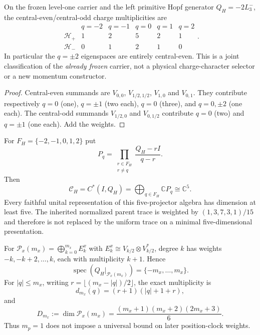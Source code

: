 \documentclass[12pt,a4paper]{article}
\begin{document}
\begin{corollary}
\label{p2d:cor:v260-joint-central-hopf-weights}
On the frozen level-one carrier and the left primitive Hopf generator
$Q_H=-2L_3^-$, the central-even/central-odd charge multiplicities are
\[
\begin{array}{c|ccccc}
 & q=-2&q=-1&q=0&q=1&q=2\\\hline
\mathcal H_+ &1&2&5&2&1\\
\mathcal H_- &0&1&2&1&0
\end{array}.
\]
In particular the $q=\pm2$ eigenspaces are entirely central-even.
This is a joint classification of the \emph{already frozen} carrier,
not a physical charge-character selector or a new momentum constructor.
\end{corollary}
\begin{proof}
Central-even summands are $V_{0,0}$, $V_{1/2,1/2}$,
$V_{1,0}$ and $V_{0,1}$. They contribute respectively
$q=0$ (one), $q=\pm1$ (two each), $q=0$ (three), and
$q=0,\pm2$ (one each). The central-odd summands
$V_{1/2,0}$ and $V_{0,1/2}$ contribute $q=0$ (two)
and $q=\pm1$ (one each). Add the weights.
\end{proof}


\begin{proposition}
\label{p2d:prop:generated-hopf-charge-algebra}
For $F_H=\{-2,-1,0,1,2\}$ put
\[
 P_q=\prod_{\substack{r\in F_H\\r\ne q}}
 \frac{Q_H-rI}{q-r}.
\]
Then
\[
 \mathcal C_H=C^*(I,Q_H)=\bigoplus_{q\in F_H}\mathbb CP_q\cong\mathbb C^5.
\]
Every faithful unital representation of this five-projector algebra has
dimension at least five.  The inherited normalized parent trace is weighted
by $(1,3,7,3,1)/15$ and therefore is not replaced by the uniform trace on a
minimal five-dimensional presentation.
\end{proposition}

\begin{proposition}
\label{p2d:prop:complete-position-hopf-multiplicities}
For
$\mathcal P_x(m_x)=\bigoplus_{k=0}^{m_x}E_k^x$ with
$E_k^x\cong V_{k/2}\otimes V_{k/2}^*$, degree $k$ has weights
$-k,-k+2,\ldots,k$, each with multiplicity $k+1$.  Hence
\[
 \operatorname{spec}(Q_H|_{\mathcal P_x(m_x)})=\{-m_x,\ldots,m_x\}.
\]
For $|q|\le m_x$, writing
$r=\lfloor(m_x-|q|)/2\rfloor$, the exact multiplicity is
\[
 d_{m_x}(q)=(r+1)(|q|+1+r),
\]
and
\[
 D_{m_x}:=\dim\mathcal P_x(m_x)
 =\frac{(m_x+1)(m_x+2)(2m_x+3)}6.
\]
Thus $m_p=1$ does not impose a universal bound on later position-clock
weights.
\end{proposition}
\end{document}
